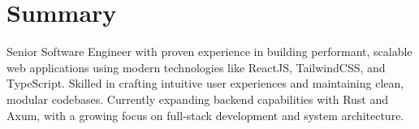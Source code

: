 \section*{Summary}
Senior Software Engineer with proven experience in building performant, scalable web applications using modern technologies like ReactJS, TailwindCSS, and TypeScript. Skilled in crafting intuitive user experiences and maintaining clean, modular codebases.
Currently expanding backend capabilities with Rust and Axum, with a growing focus on full-stack development and system architecture.
